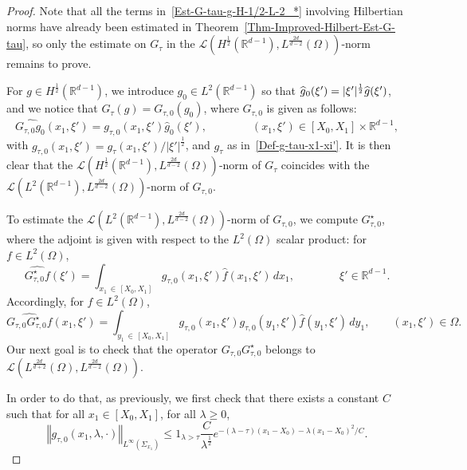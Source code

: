 \documentclass[10pt]{amsart}
\theoremstyle{definition}\newtheorem{defi}[theo]{Definition}\newtheorem{rema}[theo]{Remark}\newtheorem{exam}[theo]{Example}\newtheorem{exem}[theo]{Example}\newtheorem{nota}[theo]{Notation}
\newcommand{\scL}{\mathscr{L}}
\newcommand*\R{\mathbb{R}}
\newcommand{\norm}[1]{\left\Vert#1\right\Vert}
\renewcommand{\leq}{\leqslant}
\renewcommand{\geq}{\geqslant}
\renewcommand{\hat}{\widehat}
\let\oldhat\hat
\renewcommand*{\hat}[1]{\mathchoice{\widehat{#1}}{\widehat{#1}}{\oldhat{#1}}{\oldhat{#1}}}
\begin{document}
\begin{proof}
Note that all the terms in~\eqref{Est-G-tau-g-H-1/2-L-2_*} involving Hilbertian norms have already been estimated in Theorem~\ref{Thm-Improved-Hilbert-Est-G-tau}, so only the estimate on $G_\tau$ in the 
\newline
$\scL(H^{\frac{1}{2}}(\R^{d-1}), L^{\frac{2d}{d-2}}(\Omega))$-norm remains to prove.

For $g \in H^{\frac{1}{2}}(\R^{d-1})$, we introduce $g_0 \in L^2(\R^{d-1})$ so that $\hat g_0 (\xi') = |\xi'|^{\frac{1}{2}} \hat g(\xi')$, and we notice that $G_\tau (g) = G_{\tau,0}(g_0)$, where $G_{\tau, 0}$ is given as follows:
\[
\widehat{G_{\tau,0} g_0} (x_1, \xi') = g_{\tau,0} (x_1, \xi') \widehat g_0(\xi'), \qquad \qquad(x_1, \xi') \in [X_0, X_1] \times \R^{d-1},
\]
with $ g_{\tau,0} (x_1, \xi') = {g_{\tau}(x_1, \xi') }/{|\xi'|^{\frac{1}{2}}}$, and $g_\tau$ as in~\eqref{Def-g-tau-x1-xi'}. It is then clear that the $\scL(H^{\frac{1}{2}}(\R^{d-1}), L^{\frac{2d}{d-2}}(\Omega))$-norm of $G_\tau$ coincides with the $\scL(L^2(\R^{d-1}), L^{\frac{2d}{d-2}}(\Omega))$-norm of $G_{\tau,0}$.

To estimate the $\scL(L^2(\R^{d-1}), L^{\frac{2d}{d-2}}(\Omega))$-norm of $G_{\tau,0}$, we compute $G_{\tau,0}^\star$, where the adjoint is given with respect to the $L^2(\Omega)$ scalar product: for $f \in L^2(\Omega)$,
\[
\widehat{G_{\tau,0}^\star f}(\xi') = \int_{x_1 \,\in\,[X_0, X_1]} g_{\tau,0} (x_1,\xi') \widehat f(x_1, \xi') \, dx_1, \qquad \qquad\xi' \in \R^{d-1}.
\]
Accordingly, for $f \in L^2(\Omega)$,
\[
\widehat{G_{\tau,0} G_{\tau,0}^\star f} (x_1, \xi') = \int_{y_1\,\in\,[X_0, X_1] }g_{\tau,0}\left(x_1, \xi'\right) g_{\tau,0}\left(y_1, \xi'\right) \widehat f\left(y_1, \xi'\right) \, dy_1,
\qquad (x_1, \xi') \in \Omega.
\]
Our next goal is to check that the operator $ G_{\tau,0} G_{\tau,0}^\star$ belongs to $\scL(L^{\frac{2d}{d+2}}(\Omega), L^{\frac{2d}{d-2}}(\Omega))$.

In order to do that, as previously, we first check that there exists a constant $C$ such that for all $x_1 \in [X_0, X_1]$, for all $\lambda \geq 0$,
\begin{equation}\label{Est-g-tau-0}
\norm{ g_{\tau,0}(x_1,\lambda, \cdot)}_{L^\infty\left(\Sigma_{x_1}\right)}
\leq 1_{\lambda > \tau} \frac{C}{\lambda^{\frac{1}{2}}} e^{-(\lambda - \tau)(x_1 - X_0) - \lambda (x_1 - X_0)^2/C}.
\end{equation}


\end{proof}
\end{document}
